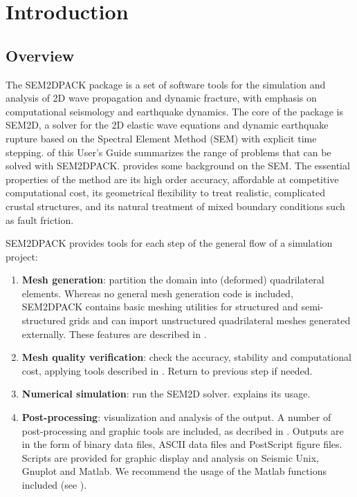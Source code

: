 \chapter{Introduction}

\section{Overview}

The SEM2DPACK package is a set of software tools for the simulation
and analysis of 2D wave propagation and dynamic fracture,
with emphasis on computational seismology and earthquake dynamics.
The core of the package is SEM2D, a solver 
for the 2D elastic wave equations and dynamic earthquake rupture 
based on the Spectral Element Method (SEM) with explicit time stepping.
 of this User's Guide summarizes the range of problems
that can be solved with SEM2DPACK.
 provides some background on the SEM.
The essential properties of the method are its high order accuracy, 
affordable at competitive computational cost, 
its geometrical flexibility to treat realistic, complicated crustal structures,
and its natural treatment of mixed boundary conditions 
such as fault friction.

SEM2DPACK provides tools for each step
of the general flow of a simulation project:
\begin{enumerate}
  \item {\bf Mesh generation}: partition the domain into (deformed) quadrilateral elements.
Whereas no general mesh generation code is included,
SEM2DPACK contains basic meshing utilities for structured and semi-structured grids
and can import unstructured quadrilateral meshes generated externally.
These features are described in .
  \item {\bf Mesh quality verification}: check the accuracy, stability and computational cost, applying tools described in .
Return to previous step if needed. 
  \item {\bf Numerical simulation}: run the SEM2D solver.
 explains its usage.
  \item {\bf Post-processing}: visualization and analysis of the output.
A number of post-processing and graphic tools are included,
as decribed in .
Outputs are in the form of binary data files, ASCII data files and PostScript figure files.
Scripts are provided for graphic display and analysis on Seismic Unix, Gnuplot and Matlab.
We recommend the usage of the Matlab functions included (see ).
\end{enumerate}

